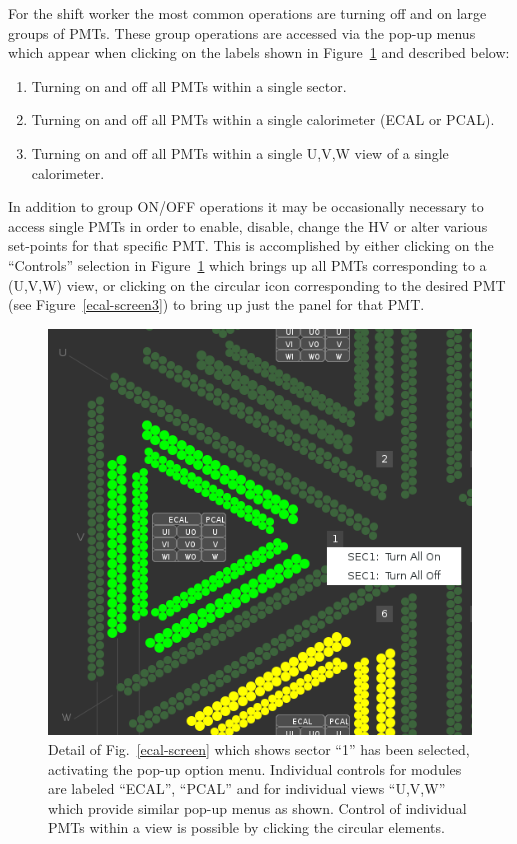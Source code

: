 \documentclass[letterpaper,10pt]{article}
\begin{document}
For the shift worker the most common operations are turning off and on large groups of PMTs.  These
group operations are accessed via the pop-up menus which appear when clicking on the labels shown in
Figure~\ref{ecal-screen2} and described below:

\begin{enumerate}
\item Turning on and off all PMTs within a single sector.
\item Turning on and off all PMTs within a single calorimeter (ECAL or PCAL).
\item Turning on and off all PMTs within a single U,V,W view of a single calorimeter.
\end{enumerate}

In addition to group ON/OFF operations it may be occasionally necessary to access single PMTs in order to
enable, disable, change the HV or alter various set-points for that specific PMT.  This is accomplished by
either clicking on the ``Controls'' selection in Figure~\ref{ecal-screen2} which brings up all PMTs corresponding
to a (U,V,W) view, or clicking on the circular icon corresponding to the desired PMT (see Figure~\ref{ecal-screen3})
to bring up just the panel for that PMT.
\begin{figure}[htbp]
  \centering
  \includegraphics[width= 5in, keepaspectratio = true]{ecal-hv-screen-5}
  \vspace{2mm}
  \caption{Detail of Fig.~\ref{ecal-screen} which shows sector ``1''
    has been selected, activating the pop-up option menu.  Individual controls for modules are
    labeled ``ECAL'', ``PCAL'' and for individual views ``U,V,W'' which provide similar pop-up menus
    as shown.  Control of individual PMTs within a view is possible by clicking the circular elements.  }
  \label{ecal-screen2}
\end{figure}
\end{document}
